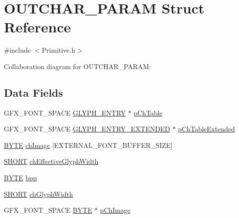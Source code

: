 \hypertarget{struct_o_u_t_c_h_a_r___p_a_r_a_m}{}\section{O\+U\+T\+C\+H\+A\+R\+\_\+\+P\+A\+R\+A\+M Struct Reference}
\label{struct_o_u_t_c_h_a_r___p_a_r_a_m}


{\ttfamily \#include $<$Primitive.\+h$>$}



Collaboration diagram for O\+U\+T\+C\+H\+A\+R\+\_\+\+P\+A\+R\+A\+M\+:
\subsection*{Data Fields}
\begin{DoxyCompactItemize}
\item 
G\+F\+X\+\_\+\+F\+O\+N\+T\+\_\+\+S\+P\+A\+C\+E \hyperlink{struct_g_l_y_p_h___e_n_t_r_y}{G\+L\+Y\+P\+H\+\_\+\+E\+N\+T\+R\+Y} $\ast$ \hyperlink{struct_o_u_t_c_h_a_r___p_a_r_a_m_abf31c96258aa522c572aecf0f3a2f67a}{p\+Ch\+Table}
\item 
G\+F\+X\+\_\+\+F\+O\+N\+T\+\_\+\+S\+P\+A\+C\+E \hyperlink{struct_g_l_y_p_h___e_n_t_r_y___e_x_t_e_n_d_e_d}{G\+L\+Y\+P\+H\+\_\+\+E\+N\+T\+R\+Y\+\_\+\+E\+X\+T\+E\+N\+D\+E\+D} $\ast$ \hyperlink{struct_o_u_t_c_h_a_r___p_a_r_a_m_aadf8c332fd7a1637201faf98b6bc3b63}{p\+Ch\+Table\+Extended}
\item 
\hyperlink{_generic_type_defs_8h_a4ae1dab0fb4b072a66584546209e7d58}{B\+Y\+T\+E} \hyperlink{struct_o_u_t_c_h_a_r___p_a_r_a_m_a3259697931fac636c111e8f7ea1e05c0}{ch\+Image} \mbox{[}E\+X\+T\+E\+R\+N\+A\+L\+\_\+\+F\+O\+N\+T\+\_\+\+B\+U\+F\+F\+E\+R\+\_\+\+S\+I\+Z\+E\mbox{]}
\item 
\hyperlink{_generic_type_defs_8h_ae9bb25d3afecf3bfab0fbe3c22c2050f}{S\+H\+O\+R\+T} \hyperlink{struct_o_u_t_c_h_a_r___p_a_r_a_m_a11dc54b7351d032f72bd9b5eaf8382ee}{ch\+Effective\+Glyph\+Width}
\item 
\hyperlink{_generic_type_defs_8h_a4ae1dab0fb4b072a66584546209e7d58}{B\+Y\+T\+E} \hyperlink{struct_o_u_t_c_h_a_r___p_a_r_a_m_af02776c3f111a79a638c5de8c5cc4f40}{bpp}
\item 
\hyperlink{_generic_type_defs_8h_ae9bb25d3afecf3bfab0fbe3c22c2050f}{S\+H\+O\+R\+T} \hyperlink{struct_o_u_t_c_h_a_r___p_a_r_a_m_a09dc0bee13d894a4ad76766cd6cb5a8d}{ch\+Glyph\+Width}
\item 
G\+F\+X\+\_\+\+F\+O\+N\+T\+\_\+\+S\+P\+A\+C\+E \hyperlink{_generic_type_defs_8h_a4ae1dab0fb4b072a66584546209e7d58}{B\+Y\+T\+E} $\ast$ \hyperlink{struct_o_u_t_c_h_a_r___p_a_r_a_m_a21a0e5b19755f1dcc70df378f804a4c9}{p\+Ch\+Image}

\end{DoxyCompactItemize}
